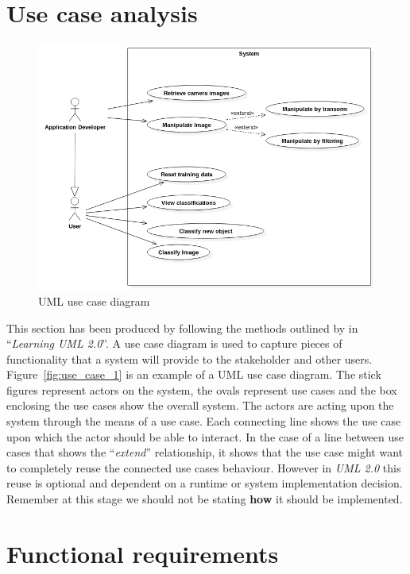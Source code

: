 \documentclass[11pt,oneside]{report}
\begin{document}
		\section{Use case analysis}
			\begin{figure}[ht]
			\begin{center}
    			\includegraphics[scale=0.45]{use_case_1}
    			\caption{UML use case diagram \protect {\label{fig:use_case_1}}}
    		\end{center}
			\end{figure}	
			This section has been produced by following the methods outlined by  in ``\textit{Learning UML 2.0}''.
			A use case diagram is used to capture pieces of functionality that a system will provide to the stakeholder and other users.
			Figure~\ref{fig:use_case_1} is an example of a UML use case diagram.
			The stick figures represent actors on the system, the ovals represent use cases and the box enclosing the use cases show the overall system. 
			The actors are acting upon the system through the means of a use case.
			Each connecting line shows the use case upon which the actor should be able to interact.
			In the case of a line between use cases that shows the ``\textit{extend}'' relationship, it shows that the use case might want to completely reuse the connected use cases behaviour.
			However in \textit{UML 2.0} this reuse is optional and dependent on a runtime or system implementation decision.
			Remember at this stage we should not be stating \textbf{how} it should be implemented.
		\section{Functional requirements}
			
\end{document}
